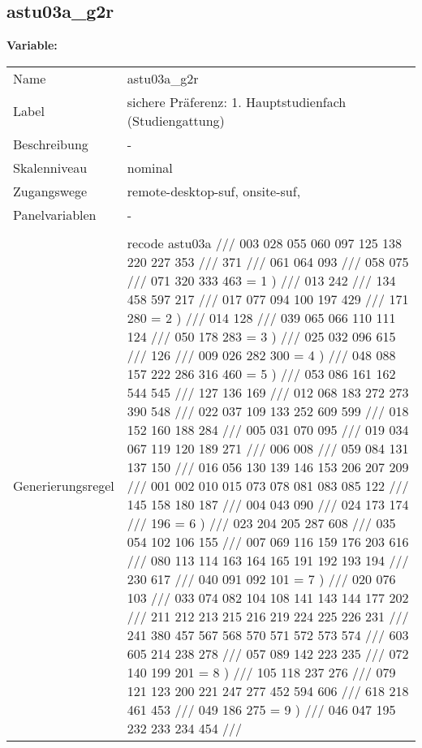 	
	
	\subsection{astu03a\_g2r}
	\label{subSection:astu03a_g2r}

	\noindent\textbf{Variable:}\\
		\begin{tabular}{lL{11.3cm}}
			\label{tableVariable:astu03a_g2r}
			Name & astu03a\_g2r \\
			Label & sichere Präferenz: 1. Hauptstudienfach  (Studiengattung) \\
			Beschreibung & - \\
			Skalenniveau & nominal \\
			Zugangswege &
				remote-desktop-suf,
				onsite-suf,
 \\
			Panelvariablen & -
			 \\
			 \\
					Generierungsregel & recode astu03a ///
003 028 055 060 097 125 138 220 227 353 ///
371          ///
061 064 093        ///
058 075         ///
071 320 333 463 = 1 )      ///
013 242         ///
134 458 597 217       ///
017 077 094 100 197 429     ///
171 280 = 2 )        ///
014 128         ///
039 065 066 110 111 124     ///
050 178 283 = 3 )       ///
025 032 096 615       ///
126          ///
009 026 282 300 = 4 )      ///
048 088 157 222 286 316 460 = 5 )   ///
053 086 161 162 544 545     ///
127 136 169        ///
012 068 183 272 273 390 548    ///
022 037 109 133 252 609 599    ///
018 152 160 188 284      ///
005 031 070 095       ///
019 034 067 119 120 189 271    ///
006 008         ///
059 084 131 137 150      ///
016 056 130 139 146 153 206 207 209  ///
001 002 010 015 073 078 081 083 085 122 ///
145 158 180 187       ///
004 043 090        ///
024 173 174        ///
196 = 6 )         ///
023 204 205 287 608      ///
035 054 102 106 155      ///
007 069 116 159 176 203 616    ///
080 113 114 163 164 165 191 192 193 194 ///
230 617         ///
040 091 092 101 = 7 )      ///
020 076 103        ///
033 074 082 104 108 141 143 144 177 202 ///
211 212 213 215 216 219 224 225 226 231 ///
241 380 457 567 568 570 571 572 573 574 ///
603 605 214 238 278      ///
057 089 142 223 235      ///
072 140 199 201 = 8 )      ///
105 118 237 276       ///
079 121 123 200 221 247 277 452 594 606 ///
618 218 461 453       ///
049 186 275 = 9 )       ///
046 047 195 232 233 234 454    ///

\end{tabular}
